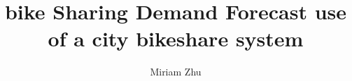\documentclass{amsart}
\begin{document}
%
%
\title[Bike Sharing Demand]{bike Sharing Demand Forecast use of a city bikeshare system}%

\author{Miriam Zhu}
\address[A.]{School of Information Technology,\\ 
Deakin University, Burwood 3125, Australia}%


%
\date{\gitAuthorDate}%




\maketitle
\tableofcontents

\newpage


\end{document}
